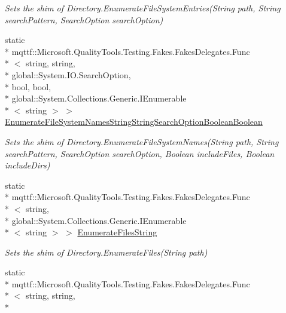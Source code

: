 \begin{DoxyCompactItemize}
\begin{DoxyCompactList}\small\item\em Sets the shim of Directory.\-Enumerate\-File\-System\-Entries(\-String path, String search\-Pattern, Search\-Option search\-Option)\end{DoxyCompactList}\item 
static \\*
mqttf\-::\-Microsoft.\-Quality\-Tools.\-Testing.\-Fakes.\-Fakes\-Delegates.\-Func\\*
$<$ string, string, \\*
global\-::\-System.\-I\-O.\-Search\-Option, \\*
bool, bool, \\*
global\-::\-System.\-Collections.\-Generic.\-I\-Enumerable\\*
$<$ string $>$ $>$ \hyperlink{class_system_1_1_i_o_1_1_fakes_1_1_shim_directory_a6104cfbc8031d5e83effba6a08dca6c9}{Enumerate\-File\-System\-Names\-String\-String\-Search\-Option\-Boolean\-Boolean}
\begin{DoxyCompactList}\small\item\em Sets the shim of Directory.\-Enumerate\-File\-System\-Names(\-String path, String search\-Pattern, Search\-Option search\-Option, Boolean include\-Files, Boolean include\-Dirs)\end{DoxyCompactList}\item 
static \\*
mqttf\-::\-Microsoft.\-Quality\-Tools.\-Testing.\-Fakes.\-Fakes\-Delegates.\-Func\\*
$<$ string, \\*
global\-::\-System.\-Collections.\-Generic.\-I\-Enumerable\\*
$<$ string $>$ $>$ \hyperlink{class_system_1_1_i_o_1_1_fakes_1_1_shim_directory_af70281f42d50b2affece5f6ebeea4a8f}{Enumerate\-Files\-String}
\begin{DoxyCompactList}\small\item\em Sets the shim of Directory.\-Enumerate\-Files(\-String path)\end{DoxyCompactList}\item 
static \\*
mqttf\-::\-Microsoft.\-Quality\-Tools.\-Testing.\-Fakes.\-Fakes\-Delegates.\-Func\\*
$<$ string, string, \\*

\end{DoxyCompactItemize}
